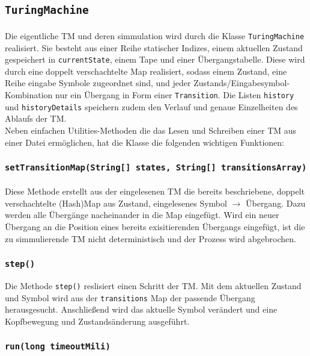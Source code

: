 \documentclass[10pt, a4paper]{article}
\newcommand{\ilc}{\texttt}
\begin{document}
\subsection*{\ilc{TuringMachine}}
\paragraph*{}
Die eigentliche TM und deren simmulation wird durch die Klasse \ilc{TuringMachine} realisiert. Sie besteht aus einer Reihe statischer Indizes, einem aktuellen Zustand gespeichert in \ilc{currentState}, einem Tape und einer Übergangstabelle. Diese wird durch eine doppelt verschachtelte Map realisiert, sodass einem Zustand, eine Reihe eingabe Symbole zugeordnet sind, und jeder Zustands/Eingabesymbol-Kombination nur ein Übergang in Form einer \ilc{Transition}.
Die Listen \ilc{history} und \ilc{historyDetails} speichern zudem den Verlauf und genaue Einzelheiten des Ablaufs der TM.\\
Neben einfachen Utilities-Methoden die das Lesen und Schreiben einer TM aus einer Datei ermöglichen, hat die Klasse die folgenden wichtigen Funktionen:\par
\subsubsection*{\ilc{setTransitionMap(String[] states, String[] transitionsArray)}}
\paragraph*{}
Diese Methode erstellt aus der eingelesenen TM die bereits beschriebene, doppelt verschachtelte (Hash)Map aus Zustand, eingelesenes Symbol $\rightarrow$ Übergang. Dazu werden alle Übergänge nacheinander in die Map eingefügt. Wird ein neuer Übergang an die Position eines bereits exisitierenden Übergangs eingefügt, ist die zu simmulierende TM nicht deterministisch und der Prozess wird abgebrochen.\par
\subsubsection*{\ilc{step()}}
Die Methode \ilc{step()} reslisiert einen Schritt der TM. Mit dem aktuellen Zustand und Symbol wird aus der \ilc{transitions} Map der passende Übergang herausgesucht. Anschließend wird das aktuelle Symbol verändert und eine Kopfbewegung und Zustandsänderung ausgeführt.
\subsubsection*{\ilc{run(long timeoutMili)}}
\end{document}
